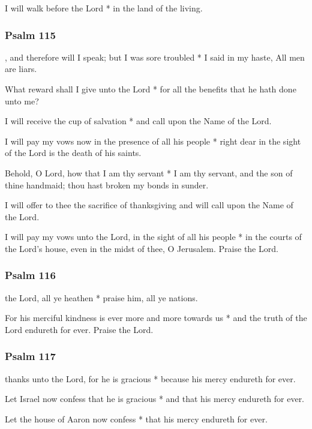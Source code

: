 I will walk before the Lord * in the land of the living.

\subsubsection{Psalm 115}


, and therefore will I speak; but I was sore troubled * I said in my haste, All men are liars.

What reward shall I give unto the Lord * for all the benefits that he hath done unto me?

I will receive the cup of salvation * and call upon the Name of the Lord.

I will pay my vows now in the presence of all his people * right dear in the sight of the Lord is the death of his saints.

Behold, O Lord, how that I am thy servant * I am thy servant, and the son of thine handmaid; thou hast broken my bonds in sunder.

I will offer to thee the sacrifice of thanksgiving and will call upon the Name of the Lord.

I will pay my vows unto the Lord, in the sight of all his people * in the courts of the Lord's house, even in the midst of thee, O Jerusalem. Praise the Lord.

\subsubsection{Psalm 116}


 the Lord, all ye heathen * praise him, all ye nations.

For his merciful kindness is ever more and more towards us * and the truth of the Lord endureth for ever. Praise the Lord.

\subsubsection{Psalm 117}


 thanks unto the Lord, for he is gracious * because his mercy endureth for ever.

Let Israel now confess that he is gracious * and that his mercy endureth for ever.

Let the house of Aaron now confess * that his mercy endureth for ever.

